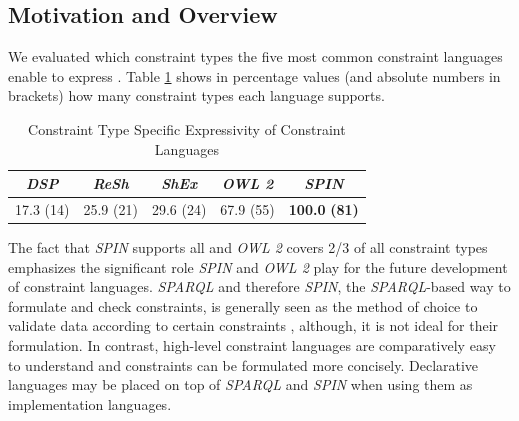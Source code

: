 \documentclass[a4paper,fontsize=11pt]{scrartcl}
\begin{document}
\subsection{Motivation and Overview}

We evaluated which constraint types the five most common constraint languages enable to express \cite{BoschNolleAcarEckert2015}.
Table \ref{tab:constraint-type-specific-expressivity} shows in percentage values (and absolute numbers in brackets) how many constraint types each language supports.

\begin{table}[H]
	\centering
		\caption{Constraint Type Specific Expressivity of Constraint Languages}
	  \scriptsize
		\begin{tabular}{c|c|c|c|c}
			\emph{DSP} & \emph{ReSh} & \emph{ShEx} & \emph{OWL 2} & \emph{SPIN} \\	
      \hline
			17.3 (14) & 25.9 (21) & 29.6 (24) & 67.9 (55) & \textbf{100.0} \textbf{(81)} 
		\end{tabular}
	\label{tab:constraint-type-specific-expressivity}
\end{table}

The fact that \emph{SPIN} supports all and \emph{OWL 2} covers 2/3 of all constraint types
emphasizes the significant role \emph{SPIN} and \emph{OWL 2} play for the future development of constraint languages.
\emph{SPARQL} and therefore \emph{SPIN}, the \emph{SPARQL}-based way to formulate and check constraints, is generally seen as the method of choice to validate data according to certain constraints \cite{Fuerber2010}, 
although, it is not ideal for their formulation. 
In contrast, high-level constraint languages are comparatively easy to understand and constraints can be formulated more concisely.
Declarative languages may be placed on top of \emph{SPARQL} and \emph{SPIN} when using them as implementation languages.
\end{document}
